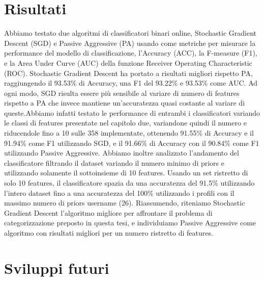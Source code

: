 \section{Risultati}
Abbiamo testato due algoritmi di classificatori binari online, Stochastic Gradient Descent (SGD) e Passive Aggressive (PA) usando come metriche per misurare la performance del modello di classificazione, l'Accuracy (ACC), la F-measure (F1), e la Area Under Curve (AUC) della funzione Receiver Operating Characteristic (ROC). Stochastic Gradient Descent ha portato a risultati migliori rispetto PA, raggiungendo il 93.53\% di Accuracy, una F1 del 93.22\% e 93.53\% come AUC. Ad ogni modo, SGD risulta essere più sensibile al variare di numero di features rispetto a PA che invece mantiene un'accuratezza quasi costante al variare di queste.\newline Abbiamo infatti testato le performance di entrambi i classificatori variando le classi di features presentate nel capitolo due, variandone quindi il numero e riducendole fino a 10 sulle 358 implementate, ottenendo 91.55\% di Accuracy e il 91.94\% come F1 utilizzando SGD, e il 91.66\% di Accuracy con il 90.84\% come F1 utilizzando Passive Aggressive. Abbiamo inoltre analizzato l'andamento del classificatore filtrando il dataset variando il numero minimo di priors e utilizzando solamente il sottoinsieme di 10 features. Usando un set ristretto di solo 10 features, il classificatore spazia da una accuratezza del 91.5\% utilizzando l'intero dataset fino a una accuratezza del 100\% utilizzando i profili con il massimo numero di priors username (26). Riassumendo, riteniamo Stochastic Gradient Descent l'algoritmo migliore per affrontare il problema di categorizzazione preposto in questa tesi, e individuiamo Passive Aggressive come algoritmo con risultati migliori per un numero ristretto di features.\newline

\section{Sviluppi futuri}

